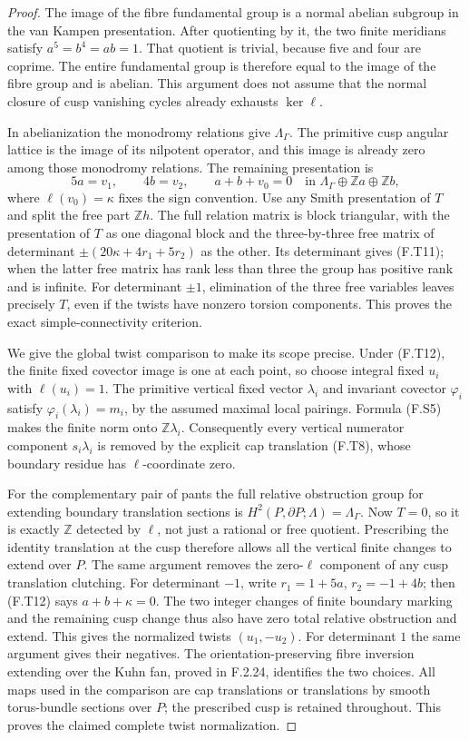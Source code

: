 \begin{proof}
The image of the fibre fundamental group is a normal
abelian subgroup in the van Kampen presentation.
After quotienting by it, the two finite meridians satisfy
$a^5=b^4=ab=1$.
That quotient is trivial, because five and four are coprime.
The entire fundamental group is therefore equal to the
image of the fibre group and is abelian.
This argument does not assume that the normal closure of
cusp vanishing cycles already exhausts $\ker\ell$.

In abelianization the monodromy relations give
$\Lambda_\Gamma$.
The primitive cusp angular lattice is the image of its
nilpotent operator, and this image is already zero among
those monodromy relations.
The remaining presentation is
\[
 5a=v_1,\qquad4b=v_2,\qquad a+b+v_0=0
 \quad\text{in }\Lambda_\Gamma\oplus\mathbb Za\oplus\mathbb Zb,
 \tag{F.T13}
\]
where $\ell(v_0)=\kappa$ fixes the sign convention.
Use any Smith presentation of $T$ and split the free part
$\mathbb Zh$.
The full relation matrix is block triangular, with the
presentation of $T$ as one diagonal block and the
three-by-three free matrix of determinant
$\pm(20\kappa+4r_1+5r_2)$ as the other.
Its determinant gives (F.T11); when the latter free
matrix has rank less than three the group has positive
rank and is infinite.
For determinant $\pm1$, elimination of the three free
variables leaves precisely $T$, even if the twists have
nonzero torsion components.
This proves the exact simple-connectivity criterion.

We give the global twist comparison to make its scope
precise.  Under (F.T12), the finite fixed covector image
is one at each point, so choose integral fixed $u_i$ with
$\ell(u_i)=1$.  The primitive vertical fixed vector
$\lambda_i$ and invariant covector $\varphi_i$ satisfy
$\varphi_i(\lambda_i)=m_i$, by the assumed maximal local
pairings.  Formula (F.S5) makes the finite norm onto
$\mathbb Z\lambda_i$.
Consequently every vertical numerator component
$s_i\lambda_i$ is removed by the explicit cap translation
(F.T8), whose boundary residue has $\ell$-coordinate zero.

For the complementary pair of pants the full relative
obstruction group for extending boundary translation
sections is
$H^2(P,\partial P;\Lambda)=\Lambda_\Gamma$.
Now $T=0$, so it is exactly $\mathbb Z$ detected by
$\ell$, not just a rational or free quotient.
Prescribing the identity translation at the cusp therefore
allows all the vertical finite changes to extend over $P$.
The same argument removes the zero-$\ell$ component of
any cusp translation clutching.
For determinant $-1$, write
$r_1=1+5a$, $r_2=-1+4b$; then (F.T12) says
$a+b+\kappa=0$.
The two integer changes of finite boundary marking and
the remaining cusp change thus also have zero total
relative obstruction and extend.
This gives the normalized twists $(u_1,-u_2)$.
For determinant $1$ the same argument gives their negatives.
The orientation-preserving fibre inversion extending over
the Kuhn fan, proved in F.2.24, identifies the two choices.
All maps used in the comparison are cap translations or
translations by smooth torus-bundle sections over $P$;
the prescribed cusp is retained throughout.
This proves the claimed complete twist normalization.
\end{proof}
